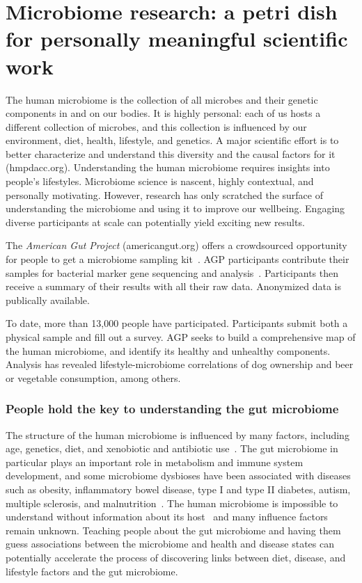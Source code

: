 \section{Microbiome research: a petri dish for personally meaningful scientific work}
The human microbiome is the collection of all microbes and
their genetic components in and on our bodies. It is highly
personal: each of us hosts a different collection of microbes,
and this collection is influenced by our environment, diet,
health, lifestyle, and genetics. A major scientific effort is to
better characterize and understand this diversity and the
causal factors for it (hmpdacc.org). Understanding the human microbiome requires insights
into people’s lifestyles. Microbiome science is nascent, highly contextual, and personally motivating.
However, research has only scratched the surface of understanding the microbiome and using it 
to improve our wellbeing. Engaging diverse participants at scale can potentially yield exciting new results.


The \textit{American Gut Project} (americangut.org) offers a
crowdsourced opportunity for people to get a microbiome
sampling kit~\cite{KnightLab2016a}. AGP
participants contribute their samples for bacterial marker
gene sequencing and analysis~\cite{Debelius2016}. Participants then receive
a summary of their results with all their raw data. Anonymized data is publically available.

To date, more than 13,000 people have participated.
Participants submit both a physical sample and fill out
a survey. AGP seeks to build a comprehensive map of the human microbiome, and identify
its healthy and unhealthy components. Analysis has revealed lifestyle-microbiome correlations
of dog ownership and beer or vegetable consumption,
among others.

\subsubsection{People hold the key to understanding the gut microbiome}
The structure of the human microbiome is influenced by many factors, including age, genetics, diet, and xenobiotic and antibiotic use~\cite{Gill2006}. The gut microbiome in particular plays an important role in metabolism and immune system development, and some microbiome dysbioses have been associated with diseases such as obesity, inflammatory bowel disease, type I and type II diabetes, autism, multiple sclerosis, and malnutrition~\cite{Cho2012}. The human microbiome is impossible to understand without information about its host~\cite{Debelius2016} and many influence factors remain unknown. Teaching people about the gut microbiome and having them guess associations between the microbiome and health and disease states can potentially accelerate the process of discovering links between diet, disease, and lifestyle factors and the gut microbiome.

